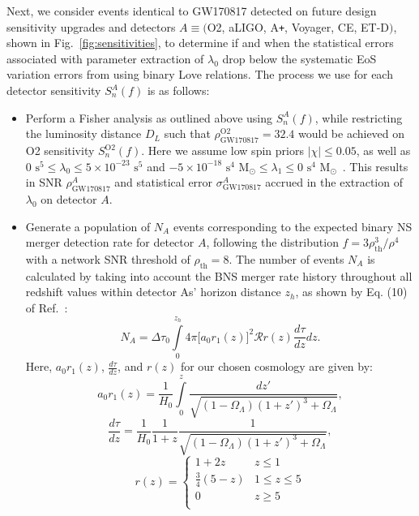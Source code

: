 \documentclass[prd,twocolumn,nofootinbib,superscriptaddress,amsmath,amssymb]{revtex4-1}
\begin{document}
Next, we consider events identical to GW170817 detected on future design sensitivity upgrades and detectors $A \equiv ($O2, aLIGO, A\texttt{+}, Voyager, CE, ET-D$)$, shown in Fig.~\ref{fig:sensitivities}, to determine if and when the statistical errors associated with parameter extraction of $\lambda_0$ drop below the systematic EoS variation errors from using binary Love relations.
The process we use for each detector sensitivity $S_n^A(f)$ is as follows:
\begin{itemize}
\item Perform a Fisher analysis as outlined above using $S_n^A(f)$, while restricting the luminosity distance $D_L$ such that $\rho^{\text{O2}}_{\text{GW170817}}=32.4$ would be achieved on O2 sensitivity $S_n^{\text{O2}}(f)$.
Here we assume low spin priors $|\chi| \leq 0.05$, as well as $0 \text{ s}^5 \leq \lambda_0 \leq 5 \times 10^{-23} \text{ s}^5$ and $-5 \times 10^{-18} \text{ s}^4\text{ M}_{\odot} \leq \lambda_1 \leq 0 \text{ s}^4\text{ M}_{\odot}$~\cite{delPozzo:TaylorTidal}.
This results in SNR $\rho^A_{\text{GW170817}}$ and statistical error $\sigma_\text{GW170817}^A$ accrued in the extraction of $\lambda_0$ on detector $A$.
\item Generate a population of $N_A$ events corresponding to the expected binary NS merger detection rate for detector $A$, following the distribution $f=3 \rho_{\text{th}}^3/\rho^4$~\cite{Shutz:SNR,Chen:SNR} with a network SNR threshold of $\rho_{\text{th}}=8$.
The number of events $N_A$ is calculated by taking into account the BNS merger rate history throughout all redshift values within detector As' horizon distance $z_h$, as shown by Eq. (10) of Ref.~\cite{Cutler:BNSmerger}:
\begin{equation}
N_A=\Delta \tau_0 \int\limits^{z_{h}}_0 4 \pi \lbrack  a_0r_1(z)\rbrack^2 \mathcal{R} r(z) \frac{d \tau}{dz} dz.
\end{equation}
Here, $a_0r_1(z)$, $\frac{d\tau}{dz}$, and $r(z)$ for our chosen cosmology are given by:
\begin{equation}
a_0r_1(z) = \frac{1}{H_0}\int\limits^z_0 \frac{dz'}{\sqrt{(1-\Omega_{\Lambda})(1+z')^3+\Omega_{\Lambda}}},
\end{equation}
\begin{equation}
\frac{d\tau}{dz} = \frac{1}{H_0} \frac{1}{1+z}\frac{1}{\sqrt{(1-\Omega_{\Lambda})(1+z')^3+\Omega_{\Lambda}}},
\end{equation}
\begin{equation}
r(z) = \left\{
\begin{array}{ll}
      1+2z & z \leq 1 \\
      \frac{3}{4}(5-z) & 1\leq z\leq 5 \\
      0 & z\geq 5\\ 
\end{array} 
\right.
\end{equation}


\end{itemize}
\end{document}
